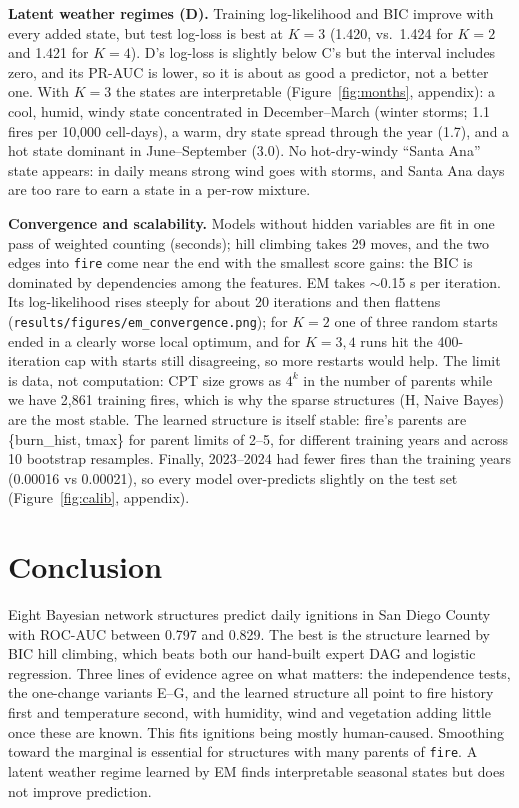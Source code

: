 \documentclass[11pt]{article}
\begin{document}
\textbf{Latent weather regimes (D).} Training log-likelihood and BIC improve with every added state,
but test log-loss is best at $K=3$ (1.420, vs.\ 1.424 for $K=2$ and 1.421 for $K=4$). D's log-loss is
slightly below C's but the interval includes zero, and its PR-AUC is lower, so it is about as good a
predictor, not a better one. With $K=3$ the states are interpretable (Figure~\ref{fig:months},
appendix): a cool, humid, windy state concentrated in December--March (winter storms; 1.1 fires per
10,000 cell-days), a warm, dry state spread through the year (1.7), and a hot state dominant in
June--September (3.0). No hot-dry-windy ``Santa Ana'' state appears: in daily means strong wind goes
with storms, and Santa Ana days are too rare to earn a state in a per-row mixture.

\textbf{Convergence and scalability.} Models without hidden variables are fit in one pass of weighted
counting (seconds); hill climbing takes 29 moves, and the two edges into \texttt{fire} come near the end with the smallest score gains: the BIC is dominated by dependencies among the features. EM takes
$\sim$0.15 s per iteration. Its log-likelihood rises steeply for about 20 iterations and then
flattens (\texttt{results/figures/em\_convergence.png}); for $K=2$ one of three random starts ended in
a clearly worse local optimum, and for $K=3,4$ runs hit the 400-iteration cap with starts still
disagreeing, so more restarts would help. The limit is data, not computation: CPT size grows as $4^k$ in the number of
parents while we have 2,861 training fires, which is why the sparse structures (H, Naive Bayes) are
the most stable. The learned structure is itself stable: fire's parents are \{burn\_hist, tmax\}
for parent limits of 2--5, for different training years and across 10 bootstrap resamples. Finally, 2023--2024 had fewer fires than the training years (0.00016 vs 0.00021),
so every model over-predicts slightly on the test set (Figure~\ref{fig:calib}, appendix).

\section{Conclusion}
\label{sec:conclusion}
Eight Bayesian network structures predict daily ignitions in San Diego County with ROC-AUC between
0.797 and 0.829. The best is the structure learned by BIC hill climbing, which beats both our
hand-built expert DAG and logistic regression. Three lines of evidence agree on what
matters: the independence tests, the one-change variants E--G, and the learned structure all point to
fire history first and temperature second, with humidity, wind and vegetation adding little once these
are known. This fits ignitions being mostly human-caused. Smoothing toward the marginal is essential
for structures with many parents of \texttt{fire}. A latent weather regime learned by EM finds
interpretable seasonal states but does not improve prediction.
\end{document}
